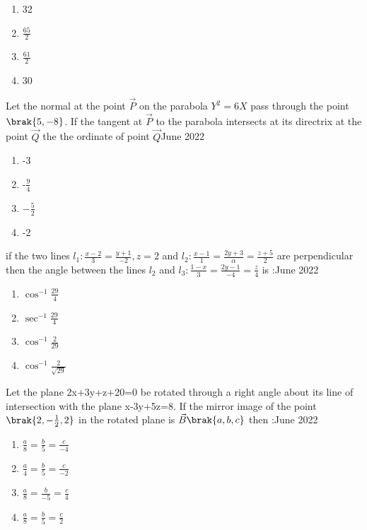\begin{enumerate}
    \item 32
    \item $\frac{65}{2}$
    \item $\frac{61}{2}$
    \item 30
\end{enumerate}
\bigskip
\item Let the normal at the point $\vec{P}$ on the parabola $Y^2=6X$ pass through the point $\brak{5,-8}$. If the tangent at $\vec{P}$ to the parabola intersects at its directrix at the point $\vec{Q}$ the the ordinate of point $\vec{Q}$\hfill{June 2022}
\begin{enumerate}
    \item -3
    \item -$\frac{9}{4}$
    \item $-\frac{5}{2}$
    \item -2
\end{enumerate}
\bigskip
\item if the two lines $l_1:\frac{x-2}{3}=\frac{y+1}{-2},z=2$ and $l_2:\frac{x-1}{1}=\frac{2y+3}{\alpha}=\frac{z+5}{2}$ are perpendicular then the angle between the lines $l_2$ and $l_3:\frac{1-x}{3}=\frac{2y-1}{-4}=\frac{z}{4} $ is :\hfill{June 2022}
\begin{enumerate}
    \item $\cos^{-1}{\frac{29}{4}}$
    \item $\sec^{-1}{\frac{29}{4}}$
    \item $\cos^{-1}{\frac{2}{29}}$
    \item $\cos^{-1}{\frac{2}{\sqrt{29}}}$
\end{enumerate}
\bigskip
\item  Let the plane 2x+3y+z+20=0 be rotated through a right angle about its line of intersection with the plane x-3y+5z=8. If the mirror image of the point $\brak{2,-\frac{1}{2},2}$ in the rotated plane is $\vec{B}\brak{a,b,c}$ then :\hfill{June 2022}
\begin{enumerate}
    \item $\frac{a}{8}=\frac{b}{5}=\frac{c}{-4}$
    \item $\frac{a}{4}=\frac{b}{5}=\frac{c}{-2}$
    \item $\frac{a}{8}=\frac{b}{-5}=\frac{c}{4}$
    \item $\frac{a}{8}=\frac{b}{5}=\frac{c}{2}$
\end{enumerate}
